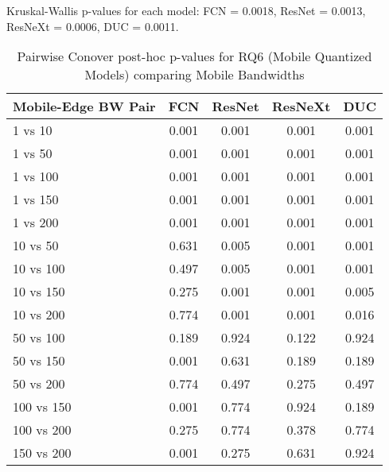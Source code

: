 \begin{table}[h]
\centering
\caption{Pairwise Conover post-hoc p-values for RQ6 (Mobile Quantized Models) comparing Mobile Bandwidths}
\label{tab:conover_mobile_quantized}
\smallskip
Kruskal-Wallis p-values for each model: FCN = 0.0018, ResNet = 0.0013, ResNeXt = 0.0006, DUC = 0.0011.

\begin{tabular}{lcccc}
\toprule
Mobile-Edge BW Pair & FCN & ResNet & ResNeXt & DUC \\
\midrule
1 vs 10 & 0.001 & 0.001 & 0.001 & 0.001 \\
1 vs 50 & 0.001 & 0.001 & 0.001 & 0.001 \\
1 vs 100 & 0.001 & 0.001 & 0.001 & 0.001 \\
1 vs 150 & 0.001 & 0.001 & 0.001 & 0.001 \\
1 vs 200 & 0.001 & 0.001 & 0.001 & 0.001 \\
10 vs 50 & 0.631 & 0.005 & 0.001 & 0.001 \\
10 vs 100 & 0.497 & 0.005 & 0.001 & 0.001 \\
10 vs 150 & 0.275 & 0.001 & 0.001 & 0.005 \\
10 vs 200 & 0.774 & 0.001 & 0.001 & 0.016 \\
50 vs 100 & 0.189 & 0.924 & 0.122 & 0.924 \\
50 vs 150 & 0.001 & 0.631 & 0.189 & 0.189 \\
50 vs 200 & 0.774 & 0.497 & 0.275 & 0.497 \\
100 vs 150 & 0.001 & 0.774 & 0.924 & 0.189 \\
100 vs 200 & 0.275 & 0.774 & 0.378 & 0.774 \\
150 vs 200 & 0.001 & 0.275 & 0.631 & 0.924 \\
\bottomrule
\end{tabular}
\end{table}
